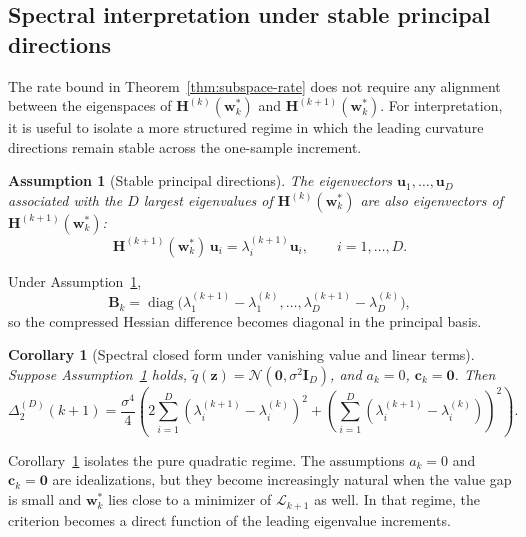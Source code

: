 \documentclass{article}
\newtheorem{assumption}{Assumption}
\newtheorem{corollary}[theorem]{Corollary}
\begin{document}
\allowdisplaybreaks

\subsection{Spectral interpretation under stable principal directions}
\label{app:spectral}

The rate bound in Theorem~\ref{thm:subspace-rate} does not require any alignment between the eigenspaces of $\mathbf H^{(k)}(\mathbf w_k^*)$ and $\mathbf H^{(k+1)}(\mathbf w_k^*)$. For interpretation, it is useful to isolate a more structured regime in which the leading curvature directions remain stable across the one-sample increment.

\begin{assumption}[Stable principal directions]
\label{ass:stable-principal}
The eigenvectors $\mathbf u_1,\dots,\mathbf u_D$ associated with the $D$ largest eigenvalues of $\mathbf H^{(k)}(\mathbf w_k^*)$ are also eigenvectors of $\mathbf H^{(k+1)}(\mathbf w_k^*)$:
\[
\mathbf H^{(k+1)}(\mathbf w_k^*)\,\mathbf u_i
=
\lambda_i^{(k+1)}\mathbf u_i,
\qquad i=1,\dots,D.
\]
\end{assumption}

Under Assumption~\ref{ass:stable-principal},
\[
\mathbf B_k
=
\operatorname{diag}\bigl(
\lambda_1^{(k+1)}-\lambda_1^{(k)},
\dots,
\lambda_D^{(k+1)}-\lambda_D^{(k)}
\bigr),
\]
so the compressed Hessian difference becomes diagonal in the principal basis.

\begin{corollary}[Spectral closed form under vanishing value and linear terms]
\label{cor:spectral}
Suppose Assumption~\ref{ass:stable-principal} holds, $\tilde q(\mathbf z)=\mathcal N(\mathbf 0,\sigma^2\mathbf I_D)$, and $a_k=0$, $\mathbf c_k=\mathbf 0$. Then
\begin{equation}
\label{eq:spectral-closed-form}
\Delta_2^{(D)}(k+1)
=
\frac{\sigma^4}{4}
\left(
2\sum_{i=1}^D (\lambda_i^{(k+1)}-\lambda_i^{(k)})^2
+
\left(
\sum_{i=1}^D (\lambda_i^{(k+1)}-\lambda_i^{(k)})
\right)^2
\right).
\end{equation}
\end{corollary}

Corollary~\ref{cor:spectral} isolates the pure quadratic regime. The assumptions $a_k=0$ and $\mathbf c_k=\mathbf 0$ are idealizations, but they become increasingly natural when the value gap is small and $\mathbf w_k^*$ lies close to a minimizer of $\mathcal L_{k+1}$ as well. In that regime, the criterion becomes a direct function of the leading eigenvalue increments.
\end{document}
